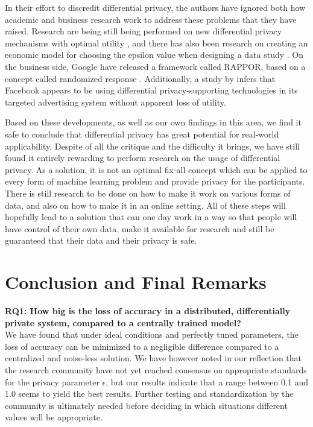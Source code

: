 In their effort to discredit differential privacy, the authors have ignored both how academic and business research work to address these problems that they have raised. Research are being still being performed on new differential privacy mechanisms with optimal utility \citep{eigner2014privada}, and there has also been research on creating an economic model for choosing the epsilon value when designing a data study \citep{hsu2014economicEpsilon}. On the business side, Google have released a framework called RAPPOR, based on a concept called randomized response \citep{erlingsson2014rappor}. Additionally, a study by \cite{chin2012differential} infers that Facebook appears to be using differential privacy-supporting technologies in its targeted advertising system without apparent loss of utility.

Based on these developments, as well as our own findings in this area, we find it safe to conclude that differential privacy has great potential for real-world applicability. Despite of all the critique and the difficulty it brings, we have still found it entirely rewarding to perform research on the usage of differential privacy. As a solution, it is not an optimal fix-all concept which can be applied to every form of machine learning problem and provide privacy for the participants. There is still research to be done on how to make it work on various forms of data, and also on how to make it in an online setting. All of these steps will hopefully lead to a solution that can one day work in a way so that people will have control of their own data, make it available for research and still be guaranteed that their data and their privacy is safe. 


\section{Conclusion and Final Remarks}
\textbf{RQ1: How big is the loss of accuracy in a distributed, differentially private system, compared to a centrally trained model?} \\
We have found that under ideal conditions and perfectly tuned parameters, the loss of accuracy can be minimized to a negligible difference compared to a centralized and noise-less solution. We have however noted in our reflection that the research community have not yet reached consensus on appropriate standards for the privacy parameter $\epsilon$, but our results indicate that a range between 0.1 and 1.0 seems to yield the best results. Further testing and standardization by the community is ultimately needed before deciding in which situations different values will be appropriate.

